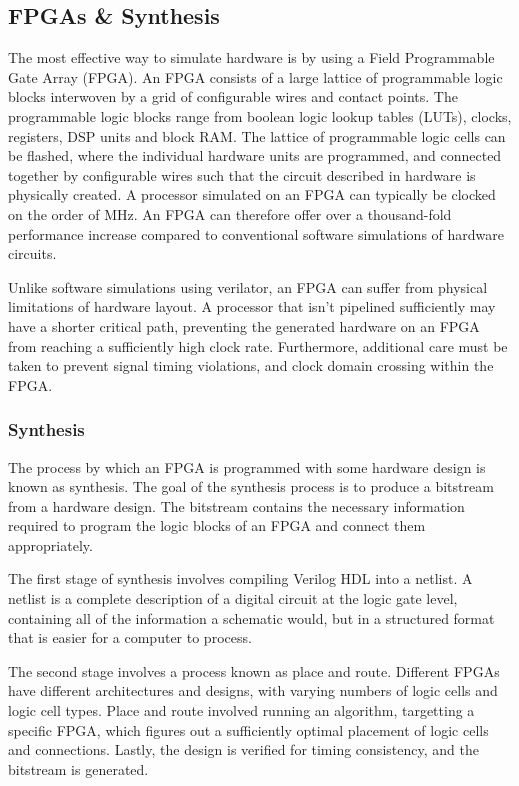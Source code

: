 \documentclass[a4paper,8pt]{report}
\begin{document}
\subsection{FPGAs \& Synthesis}
The most effective way to simulate hardware is by using a Field Programmable
Gate Array (FPGA). An FPGA consists of a large lattice of programmable logic
blocks interwoven by a grid of configurable wires and contact points. The
programmable logic blocks range from boolean logic lookup tables (LUTs), clocks,
registers, DSP units and block RAM. The lattice of programmable logic cells can
be flashed, where the individual hardware units are programmed, and connected
together by configurable wires such that the circuit described in hardware is
physically created. A processor simulated on an FPGA can typically be clocked on
the order of MHz. An FPGA can therefore offer over a thousand-fold performance
increase compared to conventional software simulations of hardware circuits.

Unlike software simulations using verilator, an FPGA can suffer from physical
limitations of hardware layout. A processor that isn't pipelined sufficiently
may have a shorter critical path, preventing the generated hardware on an FPGA
from reaching a sufficiently high clock rate. Furthermore, additional care must
be taken to prevent signal timing violations, and clock domain crossing within
the FPGA.


\subsubsection{Synthesis}
The process by which an FPGA is programmed with some hardware design is known
as synthesis. The goal of the synthesis process is to produce a bitstream from a
hardware design. The bitstream contains the necessary information required to
program the logic blocks of an FPGA and connect them appropriately.

The first stage of synthesis involves compiling Verilog HDL into a netlist.
A netlist is a complete description of a digital circuit at the logic gate
level, containing all of the information a schematic would, but in a structured
format that is easier for a computer to process.

The second stage involves a process known as place and route. Different FPGAs
have different architectures and designs, with varying numbers of logic cells
and logic cell types. Place and route involved running an algorithm, targetting
a specific FPGA, which figures out a sufficiently optimal placement of logic
cells and connections. Lastly, the design is verified for timing consistency,
and the bitstream is generated.
\end{document}
